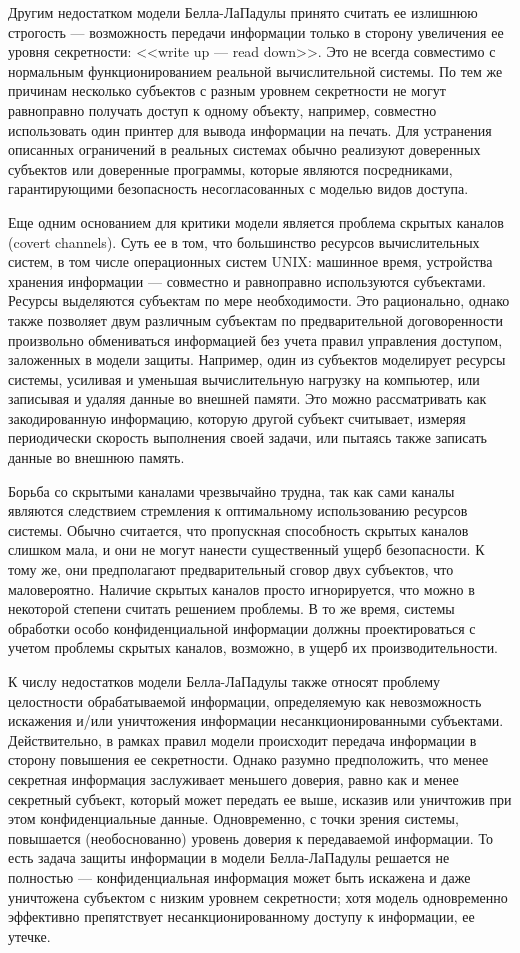Другим недостатком модели Белла-ЛаПадулы принято считать ее излишнюю строгость --- возможность передачи информации только в сторону увеличения ее уровня секретности: <<write up --- read down>>. Это не всегда совместимо с нормальным функционированием реальной вычислительной системы. По тем же причинам несколько субъектов с разным уровнем секретности не могут равноправно получать доступ к одному объекту, например, совместно использовать один принтер для вывода информации на печать. Для устранения описанных ограничений в реальных системах обычно реализуют доверенных субъектов или доверенные программы, которые являются посредниками, гарантирующими безопасность несогласованных с моделью видов доступа.

Еще одним основанием для критики модели является проблема скрытых каналов (covert channels). Суть ее в том, что большинство ресурсов вычислительных систем, в том числе операционных систем UNIX: машинное время, устройства хранения информации --- совместно и равноправно используются субъектами. Ресурсы выделяются субъектам по мере необходимости. Это рационально, однако также позволяет двум различным субъектам по предварительной договоренности произвольно обмениваться информацией без учета правил управления доступом, заложенных в модели защиты. Например, один из субъектов моделирует ресурсы системы, усиливая и уменьшая вычислительную нагрузку на компьютер, или записывая и удаляя данные во внешней памяти. Это можно рассматривать как закодированную информацию, которую другой субъект считывает, измеряя периодически скорость выполнения своей задачи, или пытаясь также записать данные во внешнюю память.

Борьба со скрытыми каналами чрезвычайно трудна, так как сами каналы являются следствием стремления к оптимальному использованию ресурсов системы. Обычно считается, что пропускная способность скрытых каналов слишком мала, и они не могут нанести существенный ущерб безопасности. К тому же, они предполагают предварительный сговор двух субъектов, что маловероятно. Наличие скрытых каналов просто игнорируется, что можно в некоторой степени считать решением проблемы. В то же время, системы обработки особо конфиденциальной информации должны проектироваться с учетом проблемы скрытых каналов, возможно, в ущерб их производительности.

К числу недостатков модели Белла-ЛаПадулы также относят проблему целостности обрабатываемой информации, определяемую как невозможность искажения и/или уничтожения информации несанкционированными субъектами. Действительно, в рамках правил модели происходит передача информации в сторону повышения ее секретности. Однако разумно предположить, что менее секретная информация заслуживает меньшего доверия, равно как и менее секретный субъект, который может передать ее выше, исказив или уничтожив при этом конфиденциальные данные. Одновременно, с точки зрения системы, повышается (необоснованно) уровень доверия к передаваемой информации. То есть задача защиты информации в модели Белла-ЛаПадулы решается не полностью --- конфиденциальная информация может быть искажена и даже уничтожена субъектом с низким уровнем секретности; хотя модель одновременно эффективно препятствует несанкционированному доступу к информации, ее утечке.

